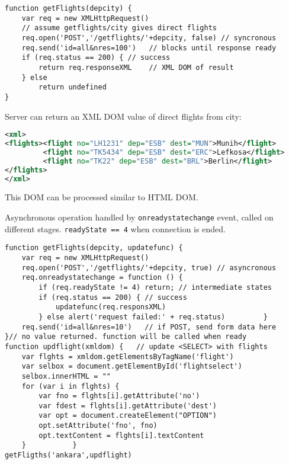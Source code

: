 \documentclass[trans,compress,xcolor=table]{beamer}
\begin{document}
\begin{frame}[fragile]
\begin{lstlisting}
function getFlights(depcity) {
    var req = new XMLHttpRequest()
    // assume getflights/city gives direct flights
    req.open('POST','/getflights/'+depcity, false) // syncronous
    req.send('id=all&nres=100')	  // blocks until response ready
    if (req.status == 200) { // success
        return req.responseXML    // XML DOM of result
    } else 
        return undefined
}
\end{lstlisting}
Server can return an XML DOM value of direct flights from city:
\begin{lstlisting}[language=XML]
<xml>
<flights><flight no="LH1231" dep="ESB" dest="MUN">Munih</flight>
         <flight no="TK5434" dep="ESB" dest="ERC">Lefkosa</flight>
         <flight no="TK22" dep="ESB" dest="BRL">Berlin</flight>
</flights>
</xml>
\end{lstlisting}
This DOM can be processed similar to HTML DOM.
\end{frame}

\begin{frame}[fragile]
Asynchronous operation handled by \lstinline!onreadystatechange! event,
called on different stages. \lstinline!readyState == 4! 
when connection is ended. 
\begin{lstlisting}
function getFlights(depcity, updatefunc) {
    var req = new XMLHttpRequest()
    req.open('POST','/getflights/'+depcity, true) // asyncronous
    req.onreadystatechange = function () {
		if (req.readyState != 4) return; // intermediate states
        if (req.status == 200) { // success
            updatefunc(req.responsXML)    
        } else alert('request failed:' + req.status)		 } 
    req.send('id=all&nres=10')   // if POST, send form data here
}// no value returned. function will be called when ready
function updflight(xmldom) {   // update <SELECT> with flights
    var flghts = xmldom.getElementsByTagName('flight')
    var selbox = document.getElementById('flightselect')
    selbox.innerHTML = ""
    for (var i in flghts) {
        var fno = flghts[i].getAttribute('no')
        var fdest = flghts[i].getAttribute('dest')
        var opt = document.createElement("OPTION")
        opt.setAttribute('fno', fno)
        opt.textContent = flghts[i].textContent
    } 			}
getFligths('ankara',updflight)
\end{lstlisting}
\end{frame}
\end{document}
